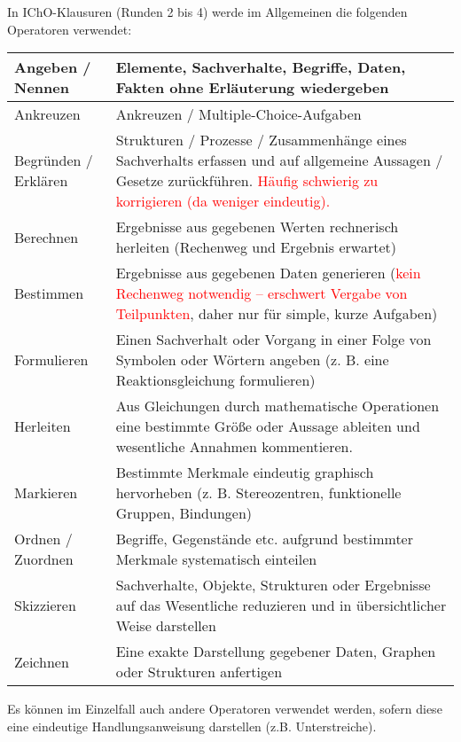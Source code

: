 \documentclass[./main.tex]{subfiles}
\begin{document}
\newpage
In IChO-Klausuren (Runden 2 bis 4) werde im Allgemeinen die folgenden Operatoren verwendet: 
\begin{tabular}{|C{2.2cm}|L{13.7cm}|}\hline
Angeben / Nennen & Elemente, Sachverhalte, Begriffe, Daten, Fakten ohne Erl\"auterung wiedergeben \\\hline
Ankreuzen & Ankreuzen / Multiple-Choice-Aufgaben \\\hline
Begr\"unden / Erkl\"aren & Strukturen / Prozesse / Zusammenh\"ange eines Sachverhalts erfassen und auf allgemeine Aussagen / Gesetze zur\"uckf\"uhren.\newline
\textcolor{red}{H\"aufig schwierig zu korrigieren (da weniger eindeutig).} \\\hline
Berechnen & Ergebnisse aus gegebenen Werten rechnerisch herleiten (Rechenweg und Ergebnis erwartet)\\\hline
Bestimmen & Ergebnisse aus gegebenen Daten generieren (\textcolor{red}{kein Rechenweg notwendig -- erschwert Vergabe von Teilpunkten}, daher nur f\"ur simple, kurze Aufgaben)\\\hline
Formulieren & Einen Sachverhalt oder Vorgang in einer Folge von Symbolen oder W\"ortern angeben (z. B. eine Reaktionsgleichung formulieren) \\\hline
Herleiten & Aus Gleichungen durch mathematische Operationen eine bestimmte Gr\"o\ss{}e oder Aussage ableiten und wesentliche Annahmen kommentieren. \\\hline
Markieren & Bestimmte Merkmale eindeutig graphisch hervorheben
(z. B. Stereozentren, funktionelle Gruppen, Bindungen) \\\hline
Ordnen / Zuordnen & Begriffe, Gegenst\"ande etc. aufgrund bestimmter Merkmale systematisch einteilen \\\hline
Skizzieren & Sachverhalte, Objekte, Strukturen oder Ergebnisse auf das Wesentliche reduzieren und in \"ubersichtlicher Weise darstellen \\\hline
Zeichnen & Eine exakte Darstellung gegebener Daten, Graphen oder Strukturen anfertigen \\\hline
\end{tabular}

Es k\"onnen im Einzelfall auch andere Operatoren verwendet werden, sofern diese eine eindeutige Handlungsanweisung darstellen (z.B. Unterstreiche). 
\end{document}
